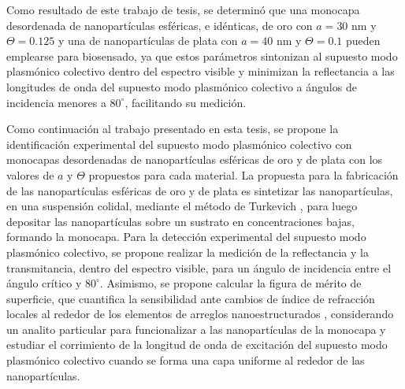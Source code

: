  Como resultado de este trabajo de tesis, se determinó que una monocapa desordenada de nanopartículas esféricas, e idénticas, de oro con $a=30$ nm y  $\Theta=0.125$ y una de nanopartículas de plata con $a=40$ nm y $\Theta=0.1$ pueden emplearse para biosensado, ya que estos parámetros sintonizan al supuesto modo plasmónico colectivo dentro del espectro visible y minimizan la reflectancia a las longitudes de onda del supuesto modo plasmónico colectivo a ángulos de incidencia menores a $80^\circ$, facilitando su medición. 
 
Como continuación al trabajo presentado en esta tesis, se propone la identificación experimental del supuesto modo plasmónico colectivo con monocapas desordenadas de nanopartículas esféricas de oro y de plata con los valores de $a$ y $\Theta$ propuestos para cada material. La propuesta para la fabricación de las nanopartículas esféricas de oro y de plata es sintetizar las nanopartículas, en una suspensión colidal, mediante el método de Turkevich \cite{wuithschick2015turkevich}, para luego depositar las nanopartículas sobre un sustrato en concentraciones bajas, formando la monocapa. Para la detección experimental del supuesto modo plasmónico colectivo, se propone realizar la medición de la reflectancia y la transmitancia, dentro del espectro visible,  para un ángulo de incidencia entre el ángulo crítico y $80^\circ$. Asimismo, se propone calcular la figura de mérito de superficie, que cuantifica la sensibilidad ante cambios de índice de refracción locales al rededor de los elementos de arreglos nanoestructurados \cite{estevez2014trends,svedendahl2009refractometric}, considerando un analito particular para funcionalizar a las nanopartículas de la monocapa y estudiar el corrimiento de la longitud de onda de excitación del supuesto modo plasmónico colectivo cuando se forma una capa uniforme al rededor de las nanopartículas.


















